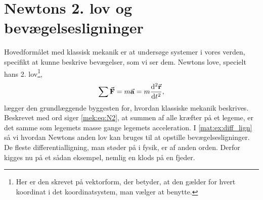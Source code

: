 \section{Newtons 2. lov og bevægelsesligninger} \label{mek:sec:fjeder}
Hovedformålet med klassisk mekanik er at undersøge systemer i vores verden, specifikt at kunne beskrive bevægelser, som vi ser dem.
Newtons love, specielt hans 2. lov\footnote{Her er den skrevet på vektorform, der betyder, at den gælder for hvert koordinat i det koordinatsystem, man vælger at benytte.},
%
\begin{align} \label{mek:eq:N2}
	\sum\va{F} = m\va{a} = m\dv[2]{\va{r}}{t},
\end{align}
%
lægger den grundlæggende byggesten for, hvordan klassiske mekanik beskrives. Beskrevet med ord siger \cref{mek:eq:N2}, at summen af alle kræfter på et legeme, er det samme som legemets masse gange legemets acceleration. I \cref{mat:ex:diff_lign} så vi hvordan Newtons anden lov kan bruges til at opstille bevægelsesligninger. De fleste differentialligning, man støder på i fysik, er af anden orden. Derfor kigges nu på et sådan eksempel, nemlig en klods på en fjeder.

